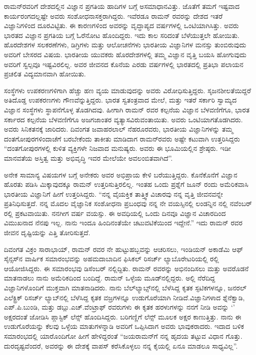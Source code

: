 \newpage


ರಾಮನ್‍ರವರಿಗೆ ದೇಶದಲ್ಲಿನ ವಿಜ್ಞಾನ ಪ್ರಗತಿಯ ಹಾದಿಗಳ ಬಗ್ಗೆ ಅಸಮಾಧಾನವಿತ್ತು. ಜೊತೆಗೆ ತಮಗೆ ಇಷ್ಟವಾದ ಕಾರ್ಯರಂಗದಲ್ಲಷ್ಟೇ ಅವರು ಸಂಶೋಧನಾಸಕ್ತರಾಗಿದ್ದರು. ಇವೆರಡೂ ರಾಮನ್ ರವರನ್ನು ದೇಶದ ಇತರೆ ವಿಜ್ಞಾನಿಗಳಿಂದ ದೂರವಿಟ್ಟಿತು. ಈ ಕಾರಣಗಳಿಂದ ಅವರನ್ನು ವೃದ್ಧಾಪ್ಯದ ವರ್ಷಗಳಲ್ಲಿ ಒಂಟಿಯಾಗಿಸಿತ್ತು. ಅವರು ಭಾರತದ ವಿಜ್ಞಾನ ಪ್ರಗತಿಯ ಬಗ್ಗೆ ಓರೆನೋಟ ಹೊಂದಿದ್ದರು. ಇದು ಕಾಲ ಸರಿದಂತೆ ಬೆಳೆಯುತ್ತಲೇ ಹೋಯಿತು. ಹೊರದೇಶಗಳ ಸಲಕರಣೆಗಳು, ಡಿಗ್ರಿಗಳು ಮತ್ತು ಆಲೋಚನೆಗಳು ಭಾರತೀಯ ವಿಜ್ಞಾನಿಗಳ ಮನಸ್ಸು ತುಂಬಿರುವುದು ಅವರಿಗೆ ಬೇಸರದ ವಿಷಯ. ಭಾರತೀಯ ಯುವಕರು ಹೊರದೇಶಗಳಲ್ಲಿ ತಮ್ಮ ವಿಜ್ಞಾನ ವೃತ್ತಿ ಬಯಸಿ ಹೋಗುವುದು ಅವರಿಗೆ ಸ್ವಲ್ಪವೂ ಇಷ್ಟವಿರಲಿಲ್ಲ. ಅವರ ಜೀವನದ ಕೊನೆಯ ಎರಡು ವರ್ಷಗಳಲ್ಲಿ ಭಾರತದಲ್ಲಿ ಪ್ರತಿಭಾ ಪಲಾಯನ ಪ್ರಚಲಿತ ವಿದ್ಯಮಾನವಾಗಿ ಹೋಯಿತು.

ಸಂಸ್ಥೆಗಳು ಉಪಕರಣಗಳಿಗಾಗಿ ಹೆಚ್ಚು ಹಣ ವ್ಯಯ ಮಾಡುವುದನ್ನು ಅವರು ವಿರೋಧಿಸು\-ತ್ತಿದ್ದರು. ಸೃಜನಶೀಲತೆಯಿದ್ದರೆ ಅತಿದೊಡ್ಡ ಉಪಕರಣಗಳು ಗೌಣವೆನ್ನುತ್ತಿದ್ದರು. ಭಾರತ ಸ್ವತಂತ್ರವಾದ ಮೇಲೆ,  ಮತ್ತು ಇತರೆ ಸರ್ಕಾರಿ ಸ್ವಾಮ್ಯದ ವಿಜ್ಞಾನ ಸಂಸ್ಥೆಗಳು ಸ್ಥಾಪನೆಗೊಳ್ಳ ತೊಡಗಿದವು. ಹೀಗಾಗಿ ರಾಮನ್ ರವರ ಕಲ್ಪನೆಯ ವಿಜ್ಞಾನ ಬೆಳವಣಿಗೆಗೂ, ಭಾರತ ಸರ್ಕಾರದ ಕಲ್ಪನೆಯ ಬೆಳವಣಿಗೆಗೂ ಅಜಗಜಾಂತರ ವ್ಯತ್ಯಾಸವಿರುವಂತಾಯಿತು. ಅವರು ಒಂಟಿಯಾಗತೊಡಗಿದರು. ಅವರು ಸಿನಿಕತನಕ್ಕೆ ಜಾರಿದರು. ದಿವಂಗತ ಜವಾಹರಲಾಲ್ ನೆಹರೂ\-ರವರು, ಭಾರತೀಯ ವಿಜ್ಞಾನಿಗಳನ್ನು ತಮ್ಮ ದಂತಗೋಪುರಗಳಿಂದಾಚೆಗೆ ಬರಬೇಕೆಂದು ತಾಕೀತು ಮಾಡಿದಾಗ ರಾಮನ್‍ರವರು ಅಷ್ಟೇ ಕಟುವಾಗಿ ಉತ್ತರಿಸಿದ್ದರು  “ದಂತಗೋಪುರಗಳಲ್ಲಿ ಕುಳಿತ ವ್ಯಕ್ತಿಗಳೇ ನಿಜವಾದ ಮನುಷ್ಯರು. ಅವರು ಈ ಭೂಮಿಯಲ್ಲಿನ ಶ್ರೇಷ್ಠರು. ಇಡೀ ಮಾನವತೆಯ ಅಸ್ತಿತ್ವ ಮತ್ತು ಅಭಿವೃದ್ಧಿ ಇವರ ಮೇಲೆಯೇ ಅವಲಂಬಿತವಾಗಿದೆ”.

ಅನೇಕ ಸಾಮಾನ್ಯ ವಿಷಯಗಳ ಬಗ್ಗೆ ಅನೇಕರು ಅವರ ಅಭಿಪ್ರಾಯ ಕೇಳಿ ಬರೆಯುತ್ತಿದ್ದರು. ಕೊನೆಕೊನೆಗೆ ವಿಜ್ಞಾನ ಹೊರತು ಪಡಿಸಿ ಮಿಕ್ಕಾವುದಕ್ಕೂ ರಾಮನ್ ಉತ್ತರಿಸುತ್ತಿರಲಿಲ್ಲ. ಇಂತಹ ಒಂದು ಪ್ರಶ್ನೆಗೆ ಜೂನ್  ರಂದು ಅಮೆರಿಕವಾಸಿ ಭಾರತೀಯ ವಿಜ್ಞಾನಿಗೆ ಹೀಗೆ ಉತ್ತರಿಸಿದ್ದರು. “ನನ್ನ ವೈಯಕ್ತಿಕ ತಾತ್ತ್ವಿಕ ವಿಚಾರವು ನನ್ನ ವೃತ್ತಿ ಜೀವನವನ್ನೇ ಪ್ರತಿನಿಧಿಸುತ್ತದೆ. ನನ್ನ ಮೊದಲ ವೈಜ್ಞಾನಿಕ ಸಂಶೋಧನಾ ಪ್ರಬಂಧವು ನನ್ನ ನೇ ವಯಸ್ಸಿನಲ್ಲಿ ಲಂಡನ್ನಿನ \textit{} ನಲ್ಲಿ ನವೆಂಬರ್ ರಲ್ಲಿ ಪ್ರಕಟವಾಯಿತು. ನನಗೀಗ  ವರ್ಷ ವಯಸ್ಸು. ಈ ಅವಧಿಯಲ್ಲಿ ಒಂದು ದಿನವೂ ವಿಜ್ಞಾನ ವಿಚಾರದಿಂದ ವಿಮುಖನಾದ ನೆನಪು ಇಲ್ಲ. ನಾನು ಇಂದೂ ಹಿಂದಿನಂತೆಯೇ ಚಟುವಟಿಕೆಯಿಂದ ಇದ್ದೇನೆ.” ಇದು ರಾಮನ್ ರವರ ಜೀವನ ದೃಷ್ಟಿಯನ್ನು ಎತ್ತಿ ತೋರಿಸುತ್ತದೆ.

ದಿವಂಗತ ವಿಕ್ರಂ ಸಾರಾಭಾಯ್, ರಾಮನ್ ರವರ ನೇ ಹುಟ್ಟುಹಬ್ಬವನ್ನು ಆಚರಿಸಲು, ಇಂಡಿಯನ್ ಅಕಾಡೆಮಿ ಆಫ್ ಸೈನ್ಸಸ್‍ನ ವಾರ್ಷಿಕ ಸಮಾರಂಭವನ್ನು ಅಹಮದಾಬಾದಿನ ಫಿಸಿಕಲ್ ರಿಸರ್ಚ್ ಲ್ಯಾಬೊರೇಟರಿಯಲ್ಲಿ ರಲ್ಲಿ ಆಯೋಜಿಸಿದ್ದರು. ಈ ಸಮಾರಂಭವು ಡಿಸೆಂಬರ್ ನಲ್ಲಿದ್ದಿತು. ರಾಮನ್ ರವರನ್ನು ಅಭಿನಂದಿಸಲು ಮತ್ತು ಅವರೊಡನೆ ಮಾತನಾಡಲು ನಾನು ಅಮೆರಿಕದಿಂದ ಬಂದಿದ್ದೆ. ರಾಮನ್ ಒಳ್ಳೆಯ ಮೂಡ್‍ನಲ್ಲಿದ್ದರು. ಅಲ್ಲಿ ನೆರೆದಿದ್ದ ವಿಜ್ಞಾನಿಗಳೊಂದಿಗೆ ಮುಕ್ತವಾಗಿ ಮಾತನಾಡಿದರು. ನಾನು ಬೆಲ್‍ಲ್ಯಾಬ್ಸ್‌ನಲ್ಲಿ ಬೆಳೆಸಿದ್ದ ಕೃತಕ ಸ್ಫಟಿಕಗಳನ್ನೂ, ಜನರಲ್ ಎಲೆಕ್ಟ್ರಿಕ್ ರಿಸರ್ಚ್ ಲ್ಯಾಬ್‍ನಲ್ಲಿ ಬೆಳೆಸಿದ್ದ ಕೃತಕ ವಜ್ರಗಳನ್ನೂ ಉಡುಗೊರೆಯಾಗಿ ನೀಡಿದೆ.\break ವಿಜ್ಞಾನಿಗಳಾದ ಶ್ನೆನೆಕ್ವಾಡಿ, ಎಪ್.ಪಿ.ಬುಂಡಿ, ಮತ್ತು ಡಬ್ಲು.ಎಚ್.ವೆಂಟ್ರಾಫ್ ರವರುಗಳು ಈ ಕೃತಕ ಹರಳುಗಳನ್ನು ನನಗೆ ನೀಡಿ ಅವನ್ನು ‘’ ಅಕ್ಷರದಂತೆ ಜೋಡಿಸಿ ಪ್ಲಾಸ್ಟಿಕ್ ಲೆನ್ಸ್ ಹೊಂದಿಸಿದ್ದರು. ಬರಿಗಣ್ಣಿಗೆ ಲೆನ್ಸ್ ಮೂಲಕ ಅಕ್ಷರ ಕಾಣುತ್ತಿತ್ತು. ನಾನು ಈ ಉಡುಗೊರೆಯನ್ನು ಕೆಲವು ಒಳ್ಳೆಯ ಮಾತುಗಳನ್ನಾಡಿ ಅವರಿಗೆ ಒಪ್ಪಿಸಿದಾಗ ಅವರು ಭಾವುಕರಾದರು. ಇದಾದ ಬಳಿಕ ಸಮಾರಂಭದಲ್ಲಿ ಯಾರೊಂದಿಗೋ ಹೀಗೆ ಹೇಳಿದ್ದರಂತೆ “ಜಯರಾಮನ್‍ಗೆ ನನ್ನ ಹೃದಯ ತಟ್ಟುವ ವಿಧಾನ ಗೊತ್ತು. ದುರದೃಷ್ಟವೆಂದರೆ, ಅವರನ್ನು ಈ ದೇಶಕ್ಕೆ ವಾಪಸ್ ಕರೆಸಿಕೊಳ್ಳಲು ನನ್ನ ಕೈಯಲ್ಲಿ ಏನೂ ಮಾಡಲೂ ಸಾಧ್ಯವಿಲ್ಲ”.

